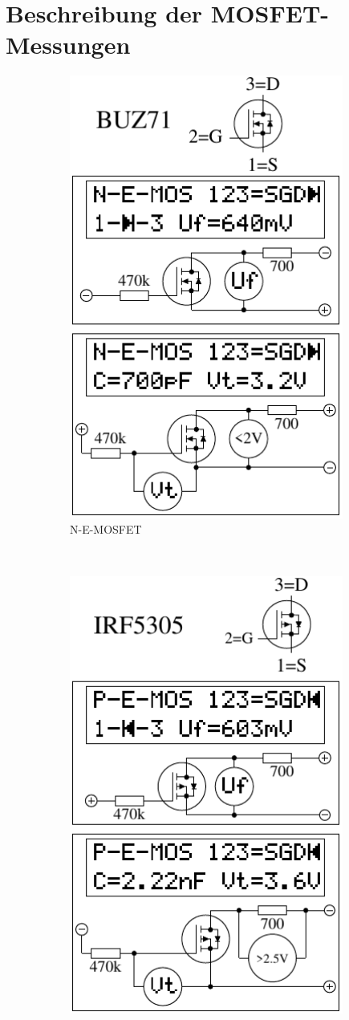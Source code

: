\chapter{Beschreibung der MOSFET-Messungen}
\label{sec:MOSmeasurements}

\begin{figure}[H]
  \begin{subfigure}[b]{9cm}
    \centering
    \includegraphics[width=9cm]{../FIG/MOS_BUZ71.pdf}
    \caption{N-E-MOSFET}
    \label{fig:MOS-N-E}
  \end{subfigure}
  ~
  \begin{subfigure}[b]{9cm}
    \centering
    \includegraphics[width=9cm]{../FIG/MOS_IRF5305.pdf}

\end{subfigure}
\end{figure}
